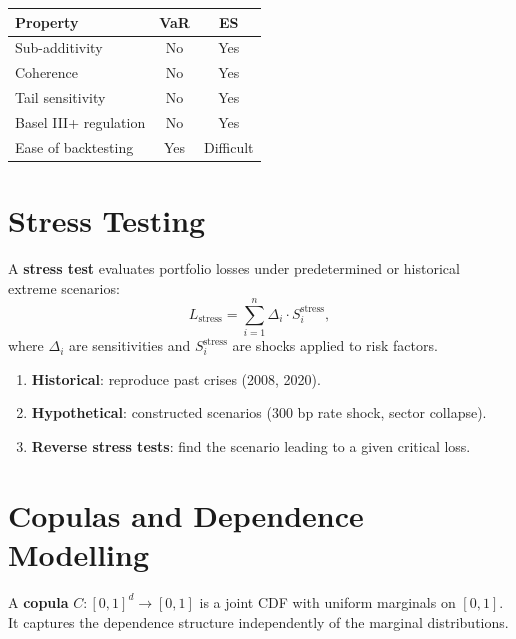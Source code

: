 \begin{keyformulas}[title=\textbf{VaR vs ES Comparison}]
\begin{center}
\begin{tabular}{lcc}
\textbf{Property} & \textbf{VaR} & \textbf{ES} \\
\hline
Sub-additivity & No & Yes \\
Coherence & No & Yes \\
Tail sensitivity & No & Yes \\
Basel III+ regulation & No & Yes \\
Ease of backtesting & Yes & Difficult \\
\end{tabular}
\end{center}
\end{keyformulas}

\section{Stress Testing}

\begin{definition}
A \textbf{stress test} evaluates portfolio losses under predetermined or
historical extreme scenarios:
\[
    L_{\text{stress}} = \sum_{i=1}^n \Delta_i \cdot S_i^{\text{stress}},
\]
where $\Delta_i$ are sensitivities and $S_i^{\text{stress}}$ are shocks
applied to risk factors.
\end{definition}

\begin{proposition}
\begin{enumerate}
    \item \textbf{Historical}: reproduce past crises (2008, 2020).
    \item \textbf{Hypothetical}: constructed scenarios (300 bp rate shock,
    sector collapse).
    \item \textbf{Reverse stress tests}: find the scenario leading to a given
    critical loss.
\end{enumerate}
\end{proposition}

\section{Copulas and Dependence Modelling}

\begin{definition}[Copula]
A \textbf{copula} $C : [0,1]^d \to [0,1]$ is a joint CDF with uniform
marginals on $[0,1]$. It captures the dependence structure independently of
the marginal distributions.
\end{definition}

